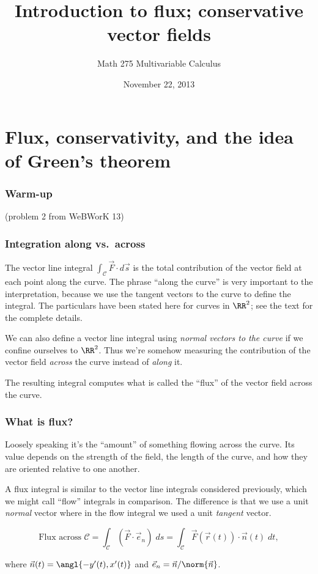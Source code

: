 \documentclass[11pt,ignorenonframetext,aspectratio=169,xcolor={svgnames}]{beamer}
\title{Introduction to flux; conservative vector fields}
\author{Math 275 Multivariable Calculus}
\date{November 22, 2013}
\begin{document}
\frame{\titlepage}

\section{Flux, conservativity, and the idea of Green's theorem}

\begin{frame}\frametitle{Warm-up}

(problem 2 from WeBWorK 13)

\end{frame}

\begin{frame}\frametitle{Integration along vs.~across}

The vector line integral $\int_{\mathcal{C}} \vec{F} \cdot d\vec{s}$ is
the total contribution of the vector field at each point along the
curve. The phrase ``along the curve'' is very important to the
interpretation, because we use the tangent vectors to the curve to
define the integral. The particulars have been stated here for curves in
$\RR^2$; see the text for the complete details.

We can also define a vector line integral using \emph{normal vectors to
the curve} if we confine ourselves to $\RR^2$. Thus we're somehow
measuring the contribution of the vector field \emph{across} the curve
instead of \emph{along} it.

The resulting integral computes what is called the ``flux'' of the
vector field across the curve.

\end{frame}

\begin{frame}\frametitle{What is flux?}

Loosely speaking it's the ``amount'' of something flowing across the
curve. Its value depends on the strength of the field, the length of the
curve, and how they are oriented relative to one another.

A flux integral is similar to the vector line integrals considered
previously, which we might call ``flow'' integrals in comparison. The
difference is that we use a unit \emph{normal} vector where in the flow
integral we used a unit \emph{tangent} vector.

\begin{equation*}
    \text{Flux across $\mathcal{C}$} = \int_{\mathcal{C}} (\vec{F} \cdot \vec{e}_n) \; ds = \int_{\mathcal{C}} \vec{F}(\vec{r}(t)) \cdot \vec{n}(t) \; dt,
\end{equation*}

where $\vec{n}(t) = \angl{-y'(t), x'(t)}$ and
$\vec{e}_n = \vec{n}/\norm{\vec{n}}$.

\end{frame}
\end{document}
